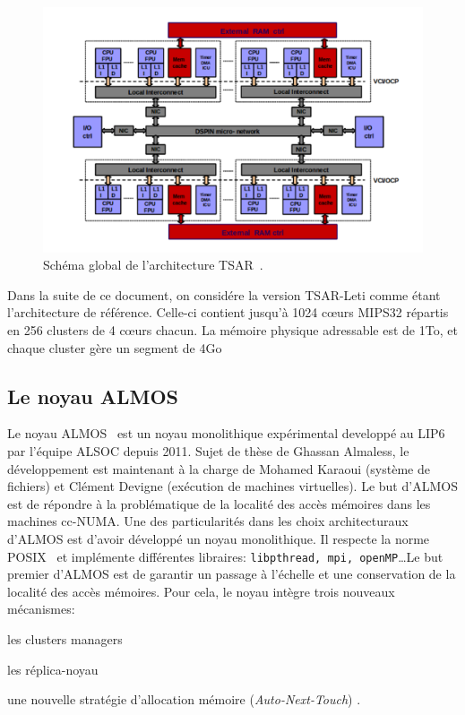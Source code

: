       \begin{figure}[ht]
        \centering \includegraphics[scale=0.2]{include/img/tsar.png}
        \caption{Schéma global de l'architecture TSAR~\citep{greiner2009tsar}.}
        \label{fig:tsar}
      \end{figure}

      Dans la suite de ce document, on considére la version TSAR-Leti comme
      étant l'architecture de référence. Celle-ci contient jusqu'à 1024 c\oe urs
      MIPS32 répartis en 256 clusters de 4 c\oe urs chacun. La mémoire physique
      adressable est de 1To, et chaque cluster gère un segment de 4Go


    \subsection{Le noyau ALMOS}
    \label{sec:almos}

      Le noyau ALMOS~\cite{almaless2011almos,almaless2014universite} est un
      noyau monolithique expérimental developpé au LIP6 par l'équipe ALSOC
      depuis 2011. Sujet de thèse de Ghassan Almaless, le développement est
      maintenant à la charge de Mohamed Karaoui (système de fichiers) et Clément
      Devigne (exécution de machines virtuelles). Le but d'ALMOS est de répondre
      à la problématique de la localité des accès mémoires dans les machines
      cc-NUMA. Une des particularités dans les choix architecturaux d'ALMOS est
      d'avoir développé un noyau monolithique. Il respecte la norme
      POSIX~\cite{posix2013} et implémente différentes libraires:
      \texttt{libpthread, mpi, openMP}\ldots Le but premier d'ALMOS est de
      garantir un passage à l'échelle et une conservation de la localité des
      accès mémoires. Pour cela, le noyau intègre trois nouveaux mécanismes:
      \benumline \item les clusters managers \item les réplica-noyau \item une
      nouvelle stratégie d'allocation mémoire (\textit{Auto-Next-Touch})
      \eenumline.


